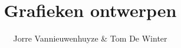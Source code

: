 \documentclass{VSAnote}
\begin{document}
\title{Grafieken ontwerpen}
\author{Jorre Vannieuwenhuyze \& Tom De Winter}
\titlepage








%
%
%
%
%
%
%


%
%
%
\end{document}

